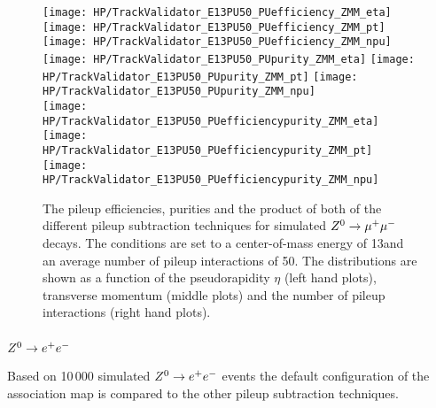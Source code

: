 \begin{figure}[!h]
  \centering
  \texttt{[image: HP/TrackValidator\_E13PU50\_PUefficiency\_ZMM\_eta]}
  \texttt{[image: HP/TrackValidator\_E13PU50\_PUefficiency\_ZMM\_pt]}
  \texttt{[image: HP/TrackValidator\_E13PU50\_PUefficiency\_ZMM\_npu]}
   \\
  \texttt{[image: HP/TrackValidator\_E13PU50\_PUpurity\_ZMM\_eta]}
  \texttt{[image: HP/TrackValidator\_E13PU50\_PUpurity\_ZMM\_pt]}
  \texttt{[image: HP/TrackValidator\_E13PU50\_PUpurity\_ZMM\_npu]}
   \\
  \texttt{[image: HP/TrackValidator\_E13PU50\_PUefficiencypurity\_ZMM\_eta]}
  \texttt{[image: HP/TrackValidator\_E13PU50\_PUefficiencypurity\_ZMM\_pt]}
  \texttt{[image: HP/TrackValidator\_E13PU50\_PUefficiencypurity\_ZMM\_npu]}
  \caption[Pileup efficiencies, purities and their product of the different pileup subtraction techniques for $\Zz\rightarrow\MM$ decays with 13\TeV and PU=50]{The pileup efficiencies, purities and the product of both of the different pileup subtraction techniques for simulated $\Zz\rightarrow\MM$ decays. The conditions are set to a center-of-mass energy of 13\TeV and an average number of pileup interactions of 50. The distributions are shown as a function of the pseudorapidity $\eta$ (left hand plots), transverse momentum (middle plots) and the number of pileup interactions (right hand plots).}
\end{figure}
\clearpage


\subsubsection{${Z^{0}}\rightarrow e^+e^-$}

Based on 10\,000 simulated  ${Z^{0}}\rightarrow e^+e^-$ events the default configuration of the association map is compared to the other pileup subtraction techniques.


